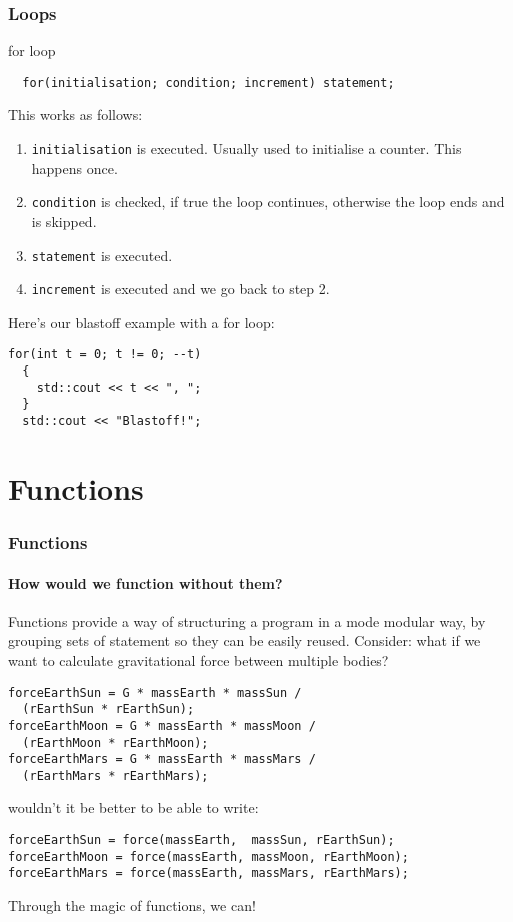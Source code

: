 \documentclass{beamer}
\begin{document}
\begin{frame}[fragile]
  \frametitle{Loops}
  
  \begin{block}{for loop}
    \begin{lstlisting}
  for(initialisation; condition; increment) statement;
    \end{lstlisting}
    This works as follows:
    \begin{enumerate}
      \item<2->{\texttt{initialisation} is executed.  Usually used to initialise a counter.  This happens once.}
      \item<3->{\texttt{condition} is checked, if true the loop continues, otherwise the loop ends and is skipped.}
      \item<4->{\texttt{statement} is executed.}
      \item<5->{\texttt{increment} is executed and we go back to step 2.}
    \end{enumerate}
    \pause[6]
    Here's our blastoff example with a for loop:
    \begin{lstlisting}[belowskip=0pt]
  for(int t = 0; t != 0; --t)
  {
    std::cout << t << ", ";
  }
  std::cout << "Blastoff!";
    \end{lstlisting}
    
  \end{block}
\end{frame}

\section{Functions}

\begin{frame}[fragile]
  \frametitle{Functions}
  \framesubtitle{How would we function without them?}
  Functions provide a way of structuring a program in a mode modular way, by grouping sets of statement so they can be easily reused.\newline
  \pause
  Consider: what if we want to calculate gravitational force between multiple bodies?
  \begin{lstlisting}
forceEarthSun = G * massEarth * massSun /
  (rEarthSun * rEarthSun);
forceEarthMoon = G * massEarth * massMoon /
  (rEarthMoon * rEarthMoon);
forceEarthMars = G * massEarth * massMars /
  (rEarthMars * rEarthMars);
  \end{lstlisting}
  \pause
  wouldn't it be better to be able to write:
  \begin{lstlisting}
forceEarthSun = force(massEarth,  massSun, rEarthSun);
forceEarthMoon = force(massEarth, massMoon, rEarthMoon);
forceEarthMars = force(massEarth, massMars, rEarthMars);
  \end{lstlisting}
  Through the magic of functions, we can!
\end{frame}
\end{document}
